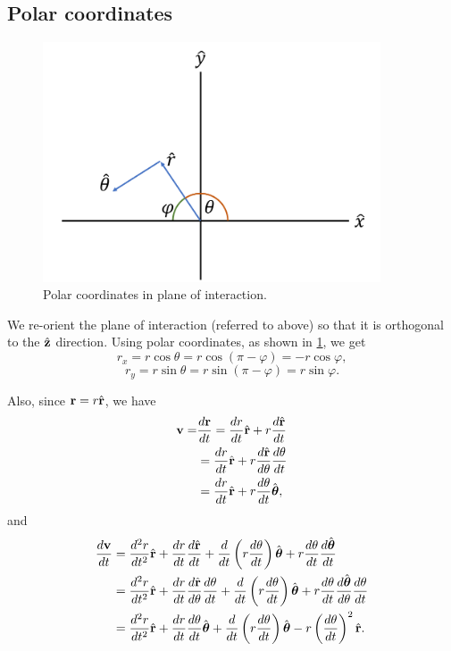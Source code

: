 \documentclass[oneside,a4paper,11pt]{report}
\begin{document}
\subsection{Polar coordinates}
\begin{figure}[ht]
    \centering
    \includegraphics[width=10cm]{../../images/polar_coordinates.png}
    \caption{Polar coordinates in plane of interaction.}
    \label{fig:polar_coordinates}
    \end{figure}

We re-orient the plane of interaction (referred to above) so that it is orthogonal to the $\hat{\mathbf{z}}$ direction. Using polar coordinates, as shown in \cref{fig:polar_coordinates}, we get
\begin{equation}
    r_x = r \cos \theta = r \cos ( \pi - \varphi ) = -r \cos \varphi,
\end{equation}
\begin{equation}
    r_y = r \sin \theta = r \sin ( \pi - \varphi ) = r \sin \varphi.
\end{equation}

Also, since $\mathbf{r} = r \hat{\mathbf{r}}$, we have
\begin{align}
    \mathbf{v} = &\frac{d \mathbf{r}}{dt} = \frac{dr}{dt} \hat{\mathbf{r}} + r \frac{d\hat{\mathbf{r}}}{dt} \nonumber \\
    &= \frac{d r}{dt} \hat{\mathbf{r}} + r \frac{d\hat{\mathbf{r}}}{d\theta} \frac{d\theta}{dt} \nonumber \\
    &= \frac{dr}{dt} \hat{\mathbf{r}} + r \frac{d \theta}{dt} \hat{\boldsymbol{\theta}},
\end{align}
and
\begin{align}
    \frac{d \mathbf{v}}{dt} &= \frac{d^2r}{dt^2} \hat{\mathbf{r}} + \frac{dr}{dt} \frac{d\hat{\mathbf{r}}}{dt} + \frac{d}{dt} \left ( r \frac{d\theta}{dt} \right ) \hat{\boldsymbol{\theta}} + r \frac{d \theta}{dt} \frac{d \hat{\boldsymbol{\theta}}}{dt} \nonumber \\
    &= \frac{d^2 r}{dt^2} \hat{\mathbf{r}} + \frac{dr}{dt} \frac{d\hat{\mathbf{r}}}{d\theta} \frac{d\theta}{dt} + \frac{d}{dt} \left ( r \frac{d\theta}{dt} \right ) \hat{\boldsymbol{\theta}} + r \frac{d \theta}{dt} \frac{d \hat{\boldsymbol{\theta}}}{d\theta} \frac{d \theta}{dt} \nonumber \\
    &= \frac{d^2r}{dt^2} \hat{\mathbf{r}} + \frac{dr}{dt} \frac{d\theta}{dt} \hat{\boldsymbol{\theta}} + \frac{d}{dt} \left ( r \frac{d\theta}{dt} \right ) \hat{\boldsymbol{\theta}} - r \left ( \frac{d\theta}{dt} \right ) ^2 \hat{\mathbf{r}}.
\end{align}
\end{document}
